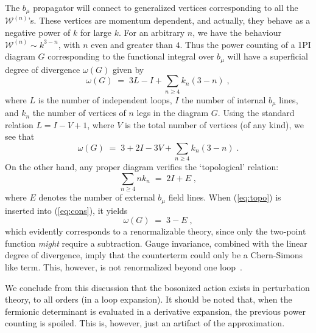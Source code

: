 \documentclass[a4paper,12pt]{article}
\begin{document}
The $b_\mu$ propagator will connect to generalized vertices
corresponding to all the ${\mathcal W}^{(n)}$'s. These vertices are
momentum dependent, and actually, they behave as a negative power of
$k$ for large $k$.  For an arbitrary $n$, we have the behaviour
${\mathcal W}^{(n)} \sim k^{3-n}$, with $n$ even and greater than $4$.
Thus the power counting of a 1PI diagram $G$ corresponding to the
functional integral over $b_\mu$ will have a superficial degree of
divergence $\omega(G)$ given by
\begin{equation}
  \label{eq:sdiv}
  \omega (G)\;=\; 3 L - I + \sum_{n \geq 4} k_n (3-n) \;,
\end{equation}
where $L$ is the number of independent loops, $I$ the number of
internal $b_\mu$ lines, and $k_n$ the number of vertices of $n$ legs
in the diagram $G$. Using the standard relation $L = I - V +1$, where
$V$ is the total number of vertices (of any kind), we see that
\begin{equation}
  \label{eq:cons}
  \omega (G)\;=\; 3 + 2 I - 3 V  + \sum_{n \geq 4} k_n (3-n) \;.
\end{equation}
On the other hand, any proper diagram verifies the `topological'
relation:
\begin{equation}
  \label{eq:topo}
  \sum_{n \geq 4} n k_n \;=\; 2 I + E \;,
\end{equation}
where $E$ denotes the number of external $b_\mu$ field lines.  When
(\ref{eq:topo}) is inserted into (\ref{eq:cons}), it yields
\begin{equation}
  \label{eq:sdivf}
  \omega (G)\;=\; 3 - E \;,
\end{equation}
which evidently corresponds to a renormalizable theory, since only the
two-point function {\em might\/} require a subtraction.  Gauge
invariance, combined with the linear degree of divergence, imply that
the counterterm could only be a Chern-Simons like term. This, however, is
not renormalized beyond one loop~\cite{coleman}.


We conclude
from this discussion that the bosonized action exists in perturbation
theory, to all orders (in a loop expansion). It should be noted that,
when the fermionic determinant is evaluated in a derivative expansion,
the previous power counting is spoiled. This is, however, just an
artifact of the approximation.
\end{document}
